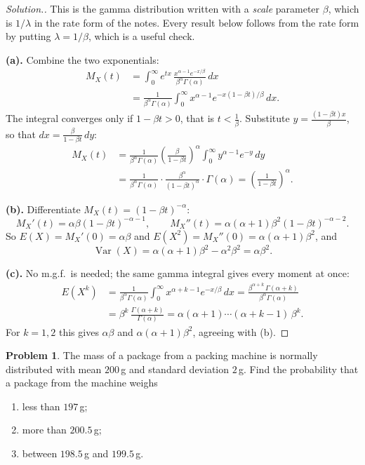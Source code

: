 \documentclass[12pt,a4paper]{report}
\theoremstyle{definition}
\theoremstyle{plain}
\theoremstyle{definition}
\newtheorem{problemx}{Problem}[section]
\newenvironment{problem}{\begin{problemx}}{\end{problemx}}
\newenvironment{solution}
  {\renewcommand{\qedsymbol}{}\begin{proof}[\textit{Solution}.]}
  {\end{proof}}
\begin{document}
\begin{solution}
This is the gamma distribution written with a \emph{scale} parameter $\beta$, which is
$1/\lambda$ in the rate form of the notes. Every result below follows from the rate form by
putting $\lambda = 1/\beta$, which is a useful check.

\textbf{(a).} Combine the two exponentials:
\begin{align*}
M_X(t) &= \int_0^{\infty} e^{tx}\,\frac{x^{\alpha-1}e^{-x/\beta}}{\beta^{\alpha}\Gamma(\alpha)}\,dx\\
 &= \frac{1}{\beta^{\alpha}\Gamma(\alpha)}\int_0^{\infty} x^{\alpha-1}e^{-x(1-\beta t)/\beta}\,dx.
\end{align*}
The integral converges only if $1-\beta t>0$, that is $t<\frac{1}{\beta}$. Substitute
$y = \frac{(1-\beta t)x}{\beta}$, so that $dx = \frac{\beta}{1-\beta t}\,dy$:
\begin{align*}
M_X(t) &= \frac{1}{\beta^{\alpha}\Gamma(\alpha)}\left(\frac{\beta}{1-\beta t}\right)^{\alpha}
\int_0^{\infty} y^{\alpha-1}e^{-y}\,dy\\
 &= \frac{1}{\beta^{\alpha}\Gamma(\alpha)}\cdot\frac{\beta^{\alpha}}{(1-\beta t)^{\alpha}}\cdot\Gamma(\alpha)
 = \left(\frac{1}{1-\beta t}\right)^{\alpha}.
\end{align*}

\textbf{(b).} Differentiate $M_X(t) = (1-\beta t)^{-\alpha}$:
\[M_X'(t) = \alpha\beta(1-\beta t)^{-\alpha-1},\qquad
M_X''(t) = \alpha(\alpha+1)\beta^{2}(1-\beta t)^{-\alpha-2}.\]
So $E(X) = M_X'(0) = \alpha\beta$ and $E(X^{2}) = M_X''(0) = \alpha(\alpha+1)\beta^{2}$, and
\[\operatorname{Var}(X) = \alpha(\alpha+1)\beta^{2}-\alpha^{2}\beta^{2} = \alpha\beta^{2}.\]

\textbf{(c).} No m.g.f.\ is needed; the same gamma integral gives every moment at once:
\begin{align*}
E(X^k) &= \frac{1}{\beta^{\alpha}\Gamma(\alpha)}\int_0^{\infty} x^{\alpha+k-1}e^{-x/\beta}\,dx
 = \frac{\beta^{\alpha+k}\,\Gamma(\alpha+k)}{\beta^{\alpha}\Gamma(\alpha)}\\
 &= \beta^{k}\,\frac{\Gamma(\alpha+k)}{\Gamma(\alpha)}
 = \alpha(\alpha+1)\cdots(\alpha+k-1)\,\beta^{k}.
\end{align*}
For $k=1,2$ this gives $\alpha\beta$ and $\alpha(\alpha+1)\beta^{2}$, agreeing with (b).
\end{solution}

\begin{problem}
The mass of a package from a packing machine is normally distributed with mean $200$\,g
and standard deviation $2$\,g. Find the probability that a package from the
machine weighs
\begin{enumerate}
\item[(a).] less than $197$\,g;
\item[(b).] more than $200.5$\,g;
\item[(c).] between $198.5$\,g and $199.5$\,g.
\end{enumerate}
\end{problem}
\end{document}

